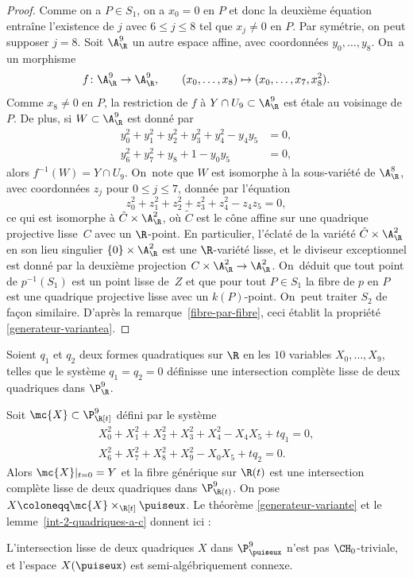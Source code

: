 \begin{proof}
Comme on a $P\in S_1$, on a $x_0=0$ en $P$ et donc la deuxième équation entraîne l'existence de $j$ avec $6\leq j\leq 8$ tel que $x_j\neq 0$ en $P$. Par symétrie, on peut supposer $j=8$. Soit $\A^9_\R$ un autre espace affine, avec coordonnées $y_0,\dots,y_8$. On~a un morphisme
\[f\colon \A^9_\R\to \A^9_\R,\qquad (x_0,\dots,x_8)\mapsto (x_0,\dots,x_7,x_8^2).\]
Comme $x_8\neq 0$ en $P$, la restriction de $f$ à $Y\cap U_9\subset \A^9_\R$ est étale au voisinage de $P$. De plus, si $W\subset \A^9_\R$ est donné par
\begin{align*}
y_0^2+y_1^2+y_2^2+y_3^2+y_4^2-y_4y_5&=0,\\
y_6^2+y_7^2+y_8+1-y_0y_5&=0,
\end{align*}
alors $f^{-1}(W)=Y\cap U_9$. On~note que $W$ est isomorphe à la sous-variété de $\A^8_\R$, avec coordonnées $z_j$ pour $0\leq j\leq 7$, donnée par l'équation
\[z_0^2+z_1^2+z_2^2+z_3^2+z_4^2-z_4z_5=0,\]
ce qui est isomorphe à $\tilde{C}\times \A^2_\R$, où $\tilde{C}$ est le cône affine sur une quadrique projective lisse~$C$ avec un $\R$-point. En particulier, l'éclaté de la variété $\tilde{C}\times \A^2_\R$ en son lieu singulier $\{0\}\times \A^2_\R$ est une $\R$-variété lisse, et le diviseur exceptionnel est donné par la deuxième projection $C\times \A^2_\R\to \A^2_\R$. On~déduit que tout point de $p^{-1}(S_1)$ est un point lisse de~$Z$ et que pour tout $P\in S_1$ la fibre de $p$ en $P$ est une quadrique projective lisse avec un $k(P)$-point. On~peut traiter $S_2$ de façon similaire. D'après la remarque~\ref{fibre-par-fibre}, ceci établit
la propriété \eqref{generateur-variantea}.
\end{proof}

Soient $q_1$ et $q_2$ deux formes quadratiques sur $\R$ en les $10$ variables $X_0,\dots,X_9$, telles que le système $q_1=q_2=0$ définisse une intersection complète lisse de deux quadriques dans $\P^9_{\R}$.

Soit $\mc{X}\subset \P^9_{\R[t]}$ défini par le système
\begin{align*}
X_0^2+X_1^2+X_2^2+X_3^2+X_4^2 - X_4X_5 +tq_1=0, \\
X_6^2+X_7^2+X_8^2+X_9^2 -X_0X_5 + tq_2=0.
\end{align*}
Alors $\mc{X}|_{t=0}=Y$ et la fibre générique sur $\R(t)$ est une intersection complète lisse de deux quadriques dans $\P^9_{\R(t)}$.
On pose $X\coloneqq \mc{X}\times_{\R[t]}\puiseux$.
Le théorème \ref{generateur-variante} et le lemme~\ref{int-2-quadriques-a-c} donnent ici :

\begin{thm}\label{intersection-quadriques-p9}
L'intersection lisse de deux quadriques $X$ dans $\P^9_{\puiseux}$ n'est pas $\CH_0$-triviale, et l'espace $X(\puiseux)$ est semi-algébriquement connexe.
\end{thm}

